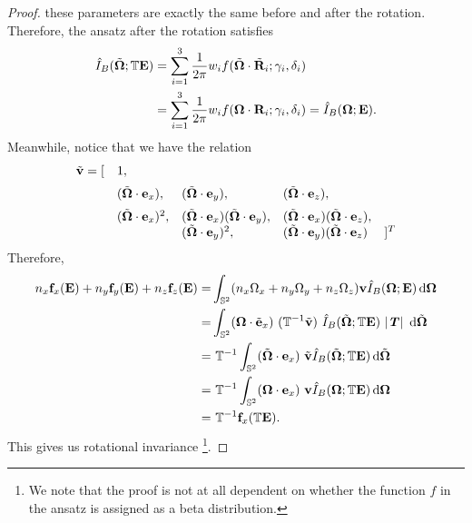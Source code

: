 \begin{proof}
  these parameters are exactly the same before and after the
  rotation. Therefore, the ansatz after the rotation satisfies 
  \[
  \begin{aligned}
    \hat I_B(\tilde{\boldsymbol{\Omega}}; \mathbb{T} \mathbf{E}) &= \sum_{i=1}^3
    \dfrac1{2\pi} w_i f(\tilde{\boldsymbol{\Omega}} \cdot \tilde{\mathbf{R}}_i; \gamma_i,
    \delta_i) \\
    &= \sum_{i=1}^3 \dfrac1{2\pi} w_i f(\boldsymbol{\Omega} \cdot \mathbf{R}_i; \gamma_i,
    \delta_i) = \hat I_B(\boldsymbol{\Omega}; \mathbf{E}).
  \end{aligned}
  \]
  Meanwhile, notice that we have the relation
  \[
  \begin{array}{rllll}
    \tilde{\mathbf{v}} = [ & 1, &&& \\ [2mm]
                    & (\tilde{\boldsymbol{\Omega}}\cdot \mathbf{e}_x), 
                         & (\tilde{\boldsymbol{\Omega}}\cdot \mathbf{e}_y), 
                           & (\tilde{\boldsymbol{\Omega}}\cdot \mathbf{e}_z), & \\ [2mm]
                    & (\tilde{\boldsymbol{\Omega}}\cdot\mathbf{e}_x)^2, 
                         & (\tilde{\boldsymbol{\Omega}}\cdot\mathbf{e}_x)(\tilde{\boldsymbol{\Omega}}\cdot\mathbf{e}_y), 
                           & (\tilde{\boldsymbol{\Omega}}\cdot\mathbf{e}_x)(\tilde{\boldsymbol{\Omega}}\cdot\mathbf{e}_z), & \\
                    && (\tilde{\boldsymbol{\Omega}}\cdot\mathbf{e}_y)^2, 
                         &(\tilde{\boldsymbol{\Omega}}\cdot\mathbf{e}_y)(\tilde{\boldsymbol{\Omega}}\cdot\mathbf{e}_z)
                           & ]^T \\
  \end{array}
  \]
  Therefore,
  \[
  \begin{split}
    n_x \mathbf{f}_x(\mathbf{E}) + n_y \mathbf{f}_y(\mathbf{E}) + n_z \mathbf{f}_z(\mathbf{E}) = &
    \int_{\mathbb{S}^2}(n_x \Omega_x + n_y \Omega_y + n_z \Omega_z)
    \mathbf{v} \hat I_B (\boldsymbol{\Omega}; \mathbf{E}) \,{\rm d}\boldsymbol{\Omega} \\
    = & \int_{\mathbb{S}^2}(\boldsymbol{\Omega} \cdot \tilde{\mathbf{e}}_x)~ (\mathbb{T}^{-1}
    \tilde{\mathbf{v}})~
    \hat I_B(\tilde{\boldsymbol{\Omega}}; \mathbb{T} \mathbf{E}) ~ | \boldsymbol{\mathit{T}} | ~\,{\rm d} \tilde{\boldsymbol{\Omega}} \\
    = & ~\mathbb{T}^{-1} \int_{\mathbb{S}^2} (\tilde{\boldsymbol{\Omega}} \cdot \mathbf{e}_x)~
    \tilde{\mathbf{v}}
    \hat I_B(\tilde{\boldsymbol{\Omega}}; \mathbb{T} \mathbf{E}) \,{\rm d} \tilde{\boldsymbol{\Omega}} \\
    = & ~\mathbb{T}^{-1} \int_{\mathbb{S}^2} (\boldsymbol{\Omega} \cdot \mathbf{e}_x)~ \mathbf{v}
    \hat I_B(\boldsymbol{\Omega}; \mathbb{T} \mathbf{E}) \,{\rm d} \boldsymbol{\Omega} \\
    = & ~\mathbb{T}^{-1} \mathbf{f}_x(\mathbb{T} \mathbf{E}).
  \end{split}
  \]
  This gives us rotational invariance \footnote{We note that the
    proof is not at all dependent on whether the function $f$ in the ansatz is
    assigned as a beta distribution.}.
\end{proof}


